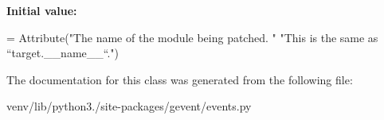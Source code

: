 {\bfseries Initial value\+:}
\begin{DoxyCode}
=  Attribute(\textcolor{stringliteral}{"The name of the module being patched. "}
                            \textcolor{stringliteral}{"This is the same as ``target.\_\_name\_\_``."})
\end{DoxyCode}


The documentation for this class was generated from the following file\+:\begin{DoxyCompactItemize}
\item 
venv/lib/python3./site-\/packages/gevent/events.\+py\end{DoxyCompactItemize}
